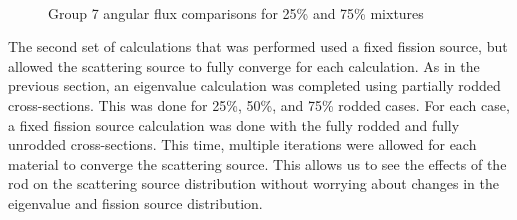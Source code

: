 \begin{figure}[H]
  \centering
  \hfill
  ~
  \caption{Group 7 angular flux comparisons for 25\% and 75\% mixtures}\label{f:1dmoc-angflux7}
\end{figure}

The second set of calculations that was performed used a fixed fission source, but allowed the scattering source to fully converge for each calculation.  As in the previous section, an eigenvalue calculation was completed using partially rodded cross-sections.  This was done for 25\%, 50\%, and 75\% rodded cases.  For each case, a fixed fission source calculation was done with the fully rodded and fully unrodded cross-sections.  This time, multiple iterations were allowed for each material to converge the scattering source.  This allows us to see the effects of the rod on the scattering source distribution without worrying about changes in the eigenvalue and fission source distribution.

